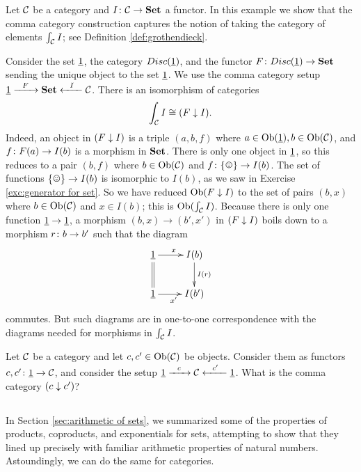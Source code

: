 \begin{example}

Let $\mathcal{C}$ be a category and $I\colon\mathcal{C}\rightarrow{\bf Set}$ a functor. In this example we show that the comma category construction captures the notion of taking the category of elements $\int_\mathcal{C} I$; see Definition \ref{def:grothendieck}. 

Consider the set $\underline{1}$, the category $Disc(\underline{1})$, and the functor $F\colon Disc(\underline{1})\rightarrow{\bf Set}$ sending the unique object to the set $\underline{1}$. We use the comma category setup $\underline{1}\xrightarrow{\ \ F\ \ }{\bf Set}\xleftarrow{\ \ I\ \ }\mathcal{C}$. There is an isomorphism of categories 
$$\int_\mathcal{C} I\cong (F\downarrow I).$$
Indeed, an object in $(F\downarrow I)$ is a triple $(a,b,f)$ where $a\in\textnormal{Ob}(\underline{1}), b\in\textnormal{Ob}(\mathcal{C})$, and $f\colon F(a)\rightarrow I(b)$ is a morphism in ${\bf Set}$. There is only one object in $\underline{1}$, so this reduces to a pair $(b,f)$ where $b\in\textnormal{Ob}(\mathcal{C})$ and $f\taking \singleton\to I(b)$. The set of functions $\singleton\to I(b)$ is isomorphic to $I(b)$, as we saw in Exercise \ref{exc:generator for set}. So we have reduced $\textnormal{Ob}(F\downarrow I)$ to the set of pairs $(b,x)$ where $b\in\textnormal{Ob}(\mathcal{C})$ and $x\in I(b)$; this is $\textnormal{Ob}(\int_\mathcal{C} I)$. Because there is only one function $\underline{1}\rightarrow\underline{1}$, a morphism $(b,x)\to(b',x')$ in $(F\downarrow I)$ boils down to a morphism $r\colon b\rightarrow b'$ such that the diagram 
$$\xymatrix{\ul{1}\ar[r]^x\ar@{=}[d]&I(b)\ar[d]^{I(r)}\\\ul{1}\ar[r]_{x'}&I(b')}$$
commutes. But such diagrams are in one-to-one correspondence with the diagrams needed for morphisms in $\int_\mathcal{C} I$.

\end{example}

\begin{exercise}
Let $\mathcal{C}$ be a category and let $c,c'\in\textnormal{Ob}(\mathcal{C})$ be objects. Consider them as functors $c,c'\colon\underline{1}\rightarrow\mathcal{C}$, and consider the setup $\underline{1}\xrightarrow{\ \ c\ \ }\mathcal{C}\xleftarrow{\ \ c'\ \ }\underline{1}$. What is the comma category $(c\downarrow c')$?
\end{exercise}


\subsection{}\label{sec:arithmetic of categories}

In Section \ref{sec:arithmetic of sets}, we summarized some of the properties of products, coproducts, and exponentials for sets, attempting to show that they lined up precisely with familiar arithmetic properties of natural numbers. Astoundingly, we can do the same for categories.

